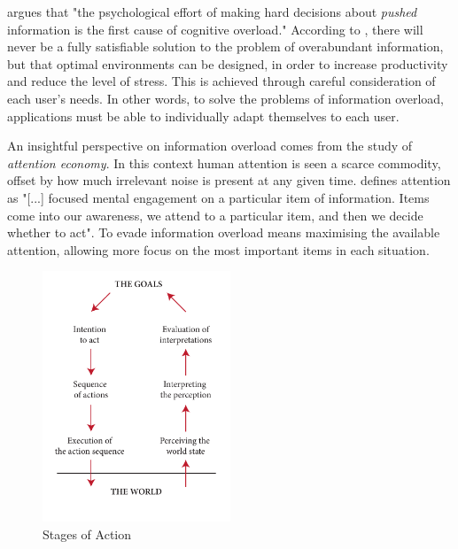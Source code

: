 \cite{Kirsh2000} argues that "the psychological effort of making hard decisions about \emph{pushed} information is the first cause of cognitive overload." 
According to \citeauthor{Kirsh2000}, there will never be a fully satisfiable solution to the problem of overabundant information, 
but that optimal environments can be designed,
in order to increase productivity and reduce the level of stress.
This is achieved through careful consideration of each user's needs. 
In other words, to solve the problems of information overload, 
applications must be able to individually adapt themselves to each user. 

An insightful perspective on information overload comes from the study of \emph{attention economy}. 
In this context human attention is seen a scarce commodity, offset by how much irrelevant noise is present at any given time. 
\citet[p1]{Davenport2001} defines attention as "[...] focused mental engagement on a particular item of information. 
Items come into our awareness, we attend to a particular item, and then we decide whether to act". 
To evade information overload means maximising the available attention, allowing more focus on the most important items in each situation.

\begin{figure}
  \vspace{-20pt}
  \begin{center}
    \includegraphics[width=0.5\textwidth]{../graphics/seven-stages.pdf}
    \vspace{-20pt}
    \caption[The Seven Stages of Action]{Stages of Action}
  \end{center}
  \label{fig:seven-stages}
  \vspace{-20pt}
\end{figure}

